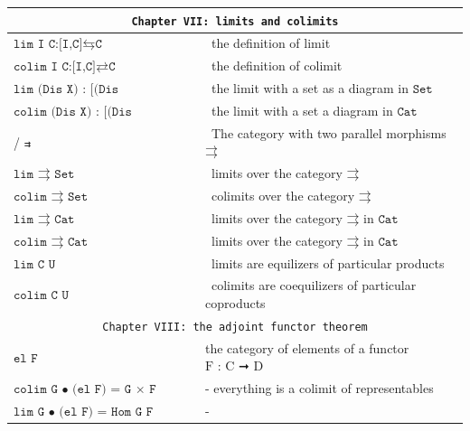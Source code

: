 \documentclass{book}
\begin{document}
{\small
\begin{center}
\begin{tabular}{|l | l |} 
\hline
\multicolumn{2}{|c|}{\texttt{Chapter VII: limits and colimits}} \\
\hline
\hline
$\texttt{lim I C:[I,C]⇆C}$  &\ the definition of limit \\
\hline
$\texttt{colim I C:[I,C]⇄C}$  &\ the definition of colimit \\
\hline
$\texttt{lim (Dis X) : [(Dis X),Set]⇄Set}$  &\ the limit with a set as a diagram in $\texttt{Set}$ \\
\hline  
$\texttt{colim (Dis X) : [(Dis X),Cat]⇄Cat}$  &\ the limit with a set a diagram in $\texttt{Cat}$ \\
/ \hline  
\texttt{⇉}  &\ The category with two parallel morphisms $\texttt{⇉}$\\
\hline
$\texttt{lim ⇉ Set}$ &\ limits over the category $\texttt{⇉}$ \\
\hline
$\texttt{colim ⇉ Set}$ &\ colimits over the category $\texttt{⇉}$ \\
\hline 
$\texttt{lim ⇉ Cat}$ &\ limits over the category $\texttt{⇉}$ in $\texttt{Cat}$ \\
\hline
$\texttt{colim ⇉ Cat}$ &\ limits over the category $\texttt{⇉}$ in $\texttt{Cat}$ \\
\hline
$\texttt{lim C U}$ &\ limits are equilizers of particular products \\
\hline
$\texttt{colim C U}$ &\ colimits are coequilizers of particular coproducts \\
\hline
\hline
\multicolumn{2}{|c|}{\texttt{Chapter VIII: the adjoint functor theorem}} \\
\hline
\hline
$\texttt{el F}$ & the category of elements of a functor $\text{F : C ➞ D}$\\
\hline
$\texttt{colim G • (el F) = G × F}$ & - everything is a colimit of representables\\
\hline
$\texttt{lim G • (el F) = Hom G F}$ & - \\
\hline
\end{tabular}
\end{center}}
\end{document}
